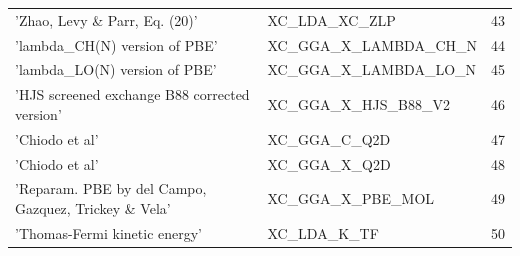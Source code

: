 \documentclass[final,12pt,makeidx,DIV=calc]{article}
\begin{document}
{{{{{{\begin{table}[!h]
\begin{center}
\begin{tabular}{llr}
  'Zhao, Levy \& Parr, Eq. (20)' & XC\_LDA\_XC\_ZLP  & 43\\
  'lambda\_CH(N) version of PBE' & XC\_GGA\_X\_LAMBDA\_CH\_N  & 44\\
  'lambda\_LO(N) version of PBE' & XC\_GGA\_X\_LAMBDA\_LO\_N  & 45\\
  'HJS screened exchange B88 corrected version' & XC\_GGA\_X\_HJS\_B88\_V2  & 46\\
  'Chiodo et al' & XC\_GGA\_C\_Q2D  & 47\\
  'Chiodo et al' & XC\_GGA\_X\_Q2D  & 48\\
  'Reparam. PBE by del Campo, Gazquez, Trickey \& Vela' & XC\_GGA\_X\_PBE\_MOL  & 49\\
  'Thomas-Fermi kinetic energy' & XC\_LDA\_K\_TF  & 50\\
\hline
\hline
\end{tabular}
\end{center}
\end{table}

}}}}}}
\end{document}
